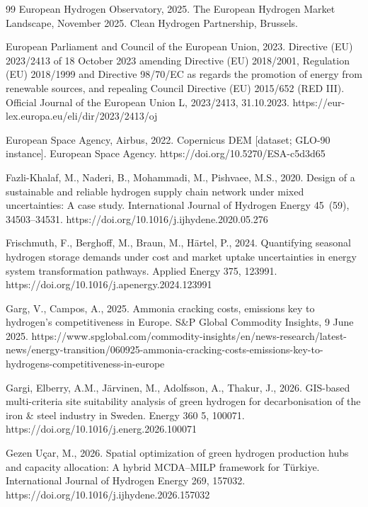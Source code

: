 \documentclass[preprint,12pt,authoryear]{elsarticle}
\begin{document}
\begin{thebibliography}{99}
European Hydrogen Observatory, 2025. The European Hydrogen Market Landscape, November 2025. Clean Hydrogen Partnership, Brussels.

European Parliament and Council of the European Union, 2023. Directive (EU) 2023/2413 of 18 October 2023 amending Directive (EU) 2018/2001, Regulation (EU) 2018/1999 and Directive 98/70/EC as regards the promotion of energy from renewable sources, and repealing Council Directive (EU) 2015/652 (RED III). Official Journal of the European Union L, 2023/2413, 31.10.2023. https://eur-lex.europa.eu/eli/dir/2023/2413/oj

{European Space Agency}, {Airbus}, 2022. Copernicus DEM [dataset; GLO-90 instance]. European Space Agency. https://doi.org/10.5270/ESA-c5d3d65

Fazli-Khalaf, M., Naderi, B., Mohammadi, M., Pishvaee, M.S., 2020. Design of a sustainable and reliable hydrogen supply chain network under mixed uncertainties: A case study. International Journal of Hydrogen Energy 45~(59), 34503--34531. https://doi.org/10.1016/j.ijhydene.2020.05.276

Frischmuth, F., Berghoff, M., Braun, M., H{\"a}rtel, P., 2024. Quantifying seasonal hydrogen storage demands under cost and market uptake uncertainties in energy system transformation pathways. Applied Energy 375, 123991. https://doi.org/10.1016/j.apenergy.2024.123991

Garg, V., Campos, A., 2025. Ammonia cracking costs, emissions key to hydrogen's competitiveness in Europe. S\&P Global Commodity Insights, 9 June 2025. https://www.spglobal.com/commodity-insights/en/news-research/latest-news/energy-transition/060925-ammonia-cracking-costs-emissions-key-to-hydrogens-competitiveness-in-europe

Gargi, Elberry, A.M., J{\"a}rvinen, M., Adolfsson, A., Thakur, J., 2026. GIS-based multi-criteria site suitability analysis of green hydrogen for decarbonisation of the iron \& steel industry in Sweden. Energy 360 5, 100071. https://doi.org/10.1016/j.energ.2026.100071

Gezen U{\c{c}}ar, M., 2026. Spatial optimization of green hydrogen production hubs and capacity allocation: A hybrid MCDA--MILP framework for T{\"u}rkiye. International Journal of Hydrogen Energy 269, 157032. https://doi.org/10.1016/j.ijhydene.2026.157032


\end{thebibliography}
\end{document}
